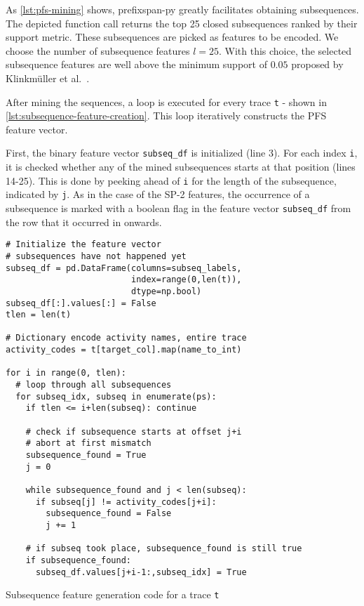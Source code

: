 As \autoref{lst:pfs-mining} shows, prefixspan-py greatly facilitates obtaining subsequences. The depicted function call returns the top 25 closed subsequences ranked by their support metric. These subsequences are picked as features to be encoded.
We choose the number of subsequence features $l=25$.
With this choice, the selected subsequence features are well above the minimum support of $0.05$ proposed by Klinkmüller et al.~\cite{klinkmuller2018reliablemonitoring}.

After mining the sequences, a loop is executed for every trace \verb=t= - shown in \autoref{lst:subsequence-feature-creation}. This loop iteratively constructs the PFS feature vector.

First, the binary feature vector \verb=subseq_df= is initialized (line 3). For each index \verb=i=, it is checked whether any of the mined subsequences starts at that position (lines 14-25). This is done by peeking ahead of \verb=i= for the length of the subsequence, indicated by \verb=j=. As in the case of the SP-2 features, the occurrence of a subsequence is marked with a boolean flag in the feature vector \verb=subseq_df= from the row that it occurred in onwards.

\begin{listing}[ht]
\begin{verbatim}
# Initialize the feature vector
# subsequences have not happened yet
subseq_df = pd.DataFrame(columns=subseq_labels,
                         index=range(0,len(t)),
                         dtype=np.bool)
subseq_df[:].values[:] = False
tlen = len(t)

# Dictionary encode activity names, entire trace
activity_codes = t[target_col].map(name_to_int)

for i in range(0, tlen):
  # loop through all subsequences
  for subseq_idx, subseq in enumerate(ps):
    if tlen <= i+len(subseq): continue

    # check if subsequence starts at offset j+i
    # abort at first mismatch
    subsequence_found = True
    j = 0

    while subsequence_found and j < len(subseq):
      if subseq[j] != activity_codes[j+i]:
        subsequence_found = False
        j += 1

    # if subseq took place, subsequence_found is still true
    if subsequence_found:
      subseq_df.values[j+i-1:,subseq_idx] = True
\end{verbatim}
\caption[Subsequence feature generation]{Subsequence feature generation code for a trace \texttt{t}}
\label{lst:subsequence-feature-creation}
\end{listing}

